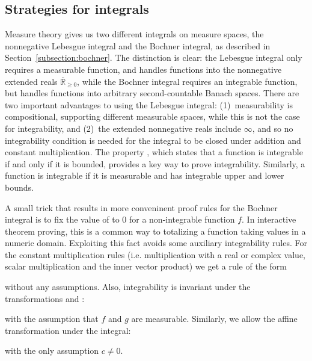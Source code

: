 \documentclass{svjour3}
\newcommand{\ennRR}{\overline{\mathbb{R}}_{\ge 0}}
\begin{document}
\subsection{Strategies for integrals}

Measure theory gives us two different integrals on measure spaces, the nonnegative Lebesgue integral and the Bochner integral, as described in Section~\ref{subsection:bochner}. The distinction is clear: the Lebesgue integral only requires a measurable function, and handles functions into the nonnegative extended reals $\ennRR$, while the Bochner integral requires an integrable function, but handles functions into arbitrary second-countable Banach spaces. There are two important advantages to using the Lebesgue integral: (1)~measurability is compositional, supporting different measurable spaces, while this is not the case for integrability, and (2)~the extended nonnegative reals include $\infty$, and so no integrability condition is needed for the integral to be closed under addition and constant multiplication. The property , which states that a function is integrable if and only if it is bounded, provides a key way to prove integrability. Similarly, a function is integrable if it is measurable and has integrable upper and lower bounds.

A small trick that results in more conveninent proof rules for the Bochner integral is to fix the value of  to $0$ for a non-integrable function $f$. In interactive theorem proving, this is a common way to totalizing a function taking values in a numeric domain. Exploiting this fact avoids some auxiliary integrability rules. For the constant multiplication rules (i.e. multiplication with a real or complex value, scalar multiplication and the inner vector product) we get a rule of the form 
\begin{quote}
\end{quote}
without any assumptions. Also, integrability is invariant under the transformations  and : 
\begin{quote}
\end{quote}
with the assumption that $f$ and $g$ are measurable. Similarly, we allow the affine transformation under the integral: 
\begin{quote}
\end{quote}
with the only assumption $c \not= 0$.
\end{document}
